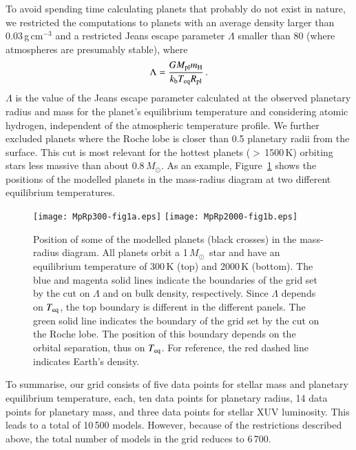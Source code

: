 \documentclass{aa}
\def\Teq{$T_{\rm eq}$}
\def\Mo{\ensuremath{M_{\odot}}}
\begin{document}
{To avoid spending time calculating planets that probably do not
exist in nature, we restricted the computations to planets with an
average density larger than 0.03\,g\,cm$^{-3}$ \citep[equal to the
lowest known measured density][]{masuda2014} and a restricted
Jeans escape parameter $\Lambda$ smaller than 80 (where
atmospheres are presumably stable), where
\citep{jeans1925,chamber1963,opik1963,fossati2017}}
%
\begin{equation}
\label{eq:lambda}
\Lambda = \frac{G M_{\rm pl}m_{\rm H}}{k_{\rm b}T_{\rm eq}R_{\rm
pl}}\,.
\end{equation}
%
{$\Lambda$ is the value of the Jeans escape parameter calculated
at the observed planetary radius and mass for the planet's
equilibrium temperature and considering atomic hydrogen,
independent of the atmospheric temperature profile. We further
excluded planets where the Roche lobe is closer than 0.5 planetary
radii from the surface. This cut is most relevant for the hottest
planets ($>$\,1500\,K) orbiting stars less massive than about
0.8\,\Mo. As an example, Figure~\ref{M_R} shows the positions of
the modelled planets in the mass-radius diagram at two different
equilibrium temperatures.}
\begin{figure}[ht!]
\texttt{[image: MpRp300-fig1a.eps]}
\texttt{[image: MpRp2000-fig1b.eps]}
\caption{{Position of some of the modelled planets (black crosses)
in the mass-radius diagram. All planets orbit a 1\,\Mo\ star and
have an equilibrium temperature of 300\,K (top) and 2000\,K
(bottom). The blue and magenta solid lines indicate the boundaries
of the grid set by the cut on $\Lambda$ and on bulk density,
respectively. Since $\Lambda$ depends on \Teq, the top boundary is
different in the different panels. The green solid line indicates
the boundary of the grid set by the cut on the Roche lobe. The
position of this boundary depends on the orbital separation, thus
on \Teq. For reference, the red dashed line indicates Earth's
density.}} \label{M_R}
\end{figure}

{To summarise, our grid consists of five data points for stellar
mass and planetary equilibrium temperature, each, ten data points
for planetary radius, 14 data points for planetary mass, and three
data points for stellar XUV luminosity. This leads to a total of
10\,500 models. However, because of the restrictions described
above, the total number of models in the grid reduces to 6\,700.}
%
\end{document}
